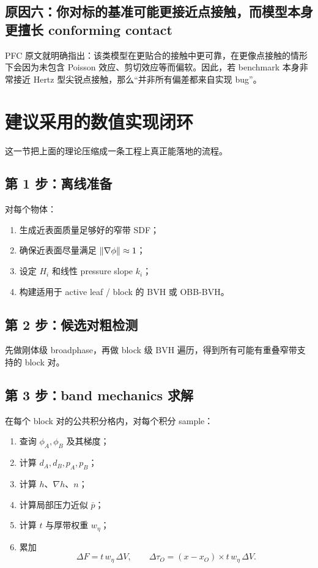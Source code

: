 \documentclass[12pt,a4paper]{ctexart}
\begin{document}
\subsection{原因六：你对标的基准可能更接近点接触，而模型本身更擅长 conforming contact}
PFC 原文就明确指出：该类模型在更贴合的接触中更可靠，在更像点接触的情形下会因为未包含 Poisson 效应、剪切效应等而偏软。因此，若 benchmark 本身非常接近 Hertz 型尖锐点接触，那么“并非所有偏差都来自实现 bug”。

\section{建议采用的数值实现闭环}

这一节把上面的理论压缩成一条工程上真正能落地的流程。

\subsection{第 1 步：离线准备}
对每个物体：
\begin{enumerate}
    \item 生成近表面质量足够好的窄带 SDF；
    \item 确保近表面尽量满足 $\norm{\nabla \phi}\approx 1$；
    \item 设定 $H_i$ 和线性 pressure slope $k_i$；
    \item 构建适用于 active leaf / block 的 BVH 或 OBB-BVH。
\end{enumerate}

\subsection{第 2 步：候选对粗检测}
先做刚体级 broadphase，再做 block 级 BVH 遍历，得到所有可能有重叠窄带支持的 block 对。

\subsection{第 3 步：band mechanics 求解}
在每个 block 对的公共积分格内，对每个积分 sample：
\begin{enumerate}
    \item 查询 $\phi_A,\phi_B$ 及其梯度；
    \item 计算 $d_A,d_B,p_A,p_B$；
    \item 计算 $h$、$\nabla h$、$n$；
    \item 计算局部压力近似 $\bar p$；
    \item 计算 $t$ 与厚带权重 $w_\eta$；
    \item 累加
    \begin{equation}
        \Delta F = t\,w_\eta\,\Delta V,
        \qquad
        \Delta \tau_O = (x-x_O)\times t\,w_\eta\,\Delta V.
    \end{equation}
\end{enumerate}
\end{document}
